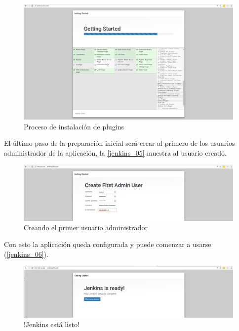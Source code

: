 \begin{figure}[htbp]
	\centering
	\includegraphics[width=1.0\linewidth]
	{desarrollo/figuras/jenkins_04.png}
	\caption{Proceso de instalación de plugins}
	\label{jenkins_04}
\end{figure}

El último paso de la preparación inicial será crear al primero de los usuarios administrador de la aplicación, la \autoref{jenkins_05} muestra al usuario creado.

\begin{figure}[htbp]
	\centering
	\includegraphics[width=1.0\linewidth]
	{desarrollo/figuras/jenkins_05.png}
	\caption{Creando el primer usuario administrador}
	\label{jenkins_05}
\end{figure}

Con esto la aplicación queda configurada y puede comenzar a usarse (\autoref{jenkins_06}).

\begin{figure}[htbp]
	\centering
	\includegraphics[width=1.0\linewidth]
	{desarrollo/figuras/jenkins_06.png}
	\caption{!Jenkins está listo!}
	\label{jenkins_06}
\end{figure}

